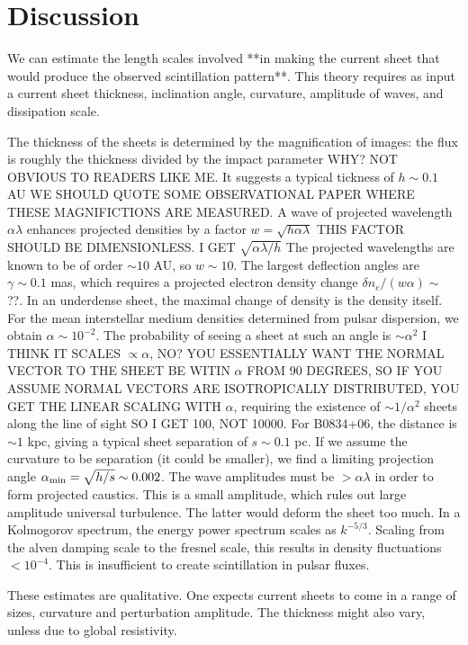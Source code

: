 \documentclass[useAMS,usenatbib]{mn2e}
\begin{document}
\section{Discussion}

We can estimate the length scales involved **in making the current sheet that
would produce the observed scintillation pattern**.  This theory requires as
input a current sheet thickness, inclination angle, curvature,
amplitude of waves, and dissipation scale.

The thickness of the sheets is determined by the magnification of
images: the flux is roughly the thickness divided by the impact
parameter WHY? NOT OBVIOUS TO READERS LIKE ME.  
It suggests a typical tickness of $h\sim 0.1$ AU WE SHOULD QUOTE SOME
OBSERVATIONAL PAPER WHERE THESE MAGNIFICTIONS ARE MEASURED.  A wave
of projected wavelength $\alpha \lambda$ enhances projected densities
by a factor $w=\sqrt{h \alpha \lambda}$ THIS FACTOR SHOULD BE 
DIMENSIONLESS. I GET $\sqrt{\alpha\lambda/h}$  The projected wavelengths
are known to be of order $\sim 10$ AU, so $w \sim 10$.  The largest
deflection angles are $\gamma \sim 0.1$ mas, which requires a
projected electron density change $\delta n_e/(w\alpha) \sim$ ??.  In an
underdense sheet, the maximal change of density is the density itself.
For the mean interstellar medium densities determined from pulsar
dispersion, we obtain $\alpha \sim 10^{-2}$.  The probability of
seeing a sheet at such an angle is $\sim \alpha^2$ I THINK IT SCALES
$\propto \alpha$, NO? YOU ESSENTIALLY WANT THE NORMAL VECTOR TO
THE SHEET BE WITIN $\alpha$ FROM 90 DEGREES, SO IF YOU ASSUME NORMAL VECTORS
ARE ISOTROPICALLY DISTRIBUTED, YOU GET THE LINEAR SCALING WITH $\alpha$, requiring the
existence of $\sim 1/\alpha^2$ sheets along the line of sight SO I GET 100, NOT
10000.  For
B0834+06, the distance is $\sim 1$ kpc, giving a typical sheet
separation of $s \sim 0.1$ pc.  If we assume the curvature to be
separation (it could be smaller), we find a limiting projection angle
$\alpha_{\rm min} = \sqrt{h/s} \sim 0.002$.  The wave amplitudes must
be $> \alpha \lambda$ in order to form projected caustics.  This is a
small amplitude, which rules out large amplitude universal turbulence.
The latter would deform the sheet too much.  In a Kolmogorov spectrum,
the energy power spectrum scales as $k^{-5/3}$.  Scaling from the
alven damping scale to the fresnel scale, this results in density
fluctuations $< 10^{-4}$.  This is insufficient to create
scintillation in pulsar fluxes.

These estimates are qualitative.  One expects current sheets to come
in a range of sizes, curvature and perturbation amplitude.  The
thickness might also vary, unless due to global resistivity.
\end{document}
